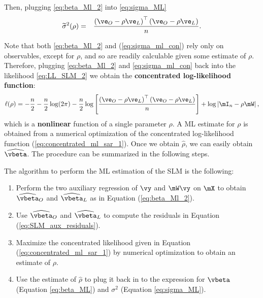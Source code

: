 Then, plugging \eqref{eq:beta_Ml_2} into \eqref{eq:sigma_ML}
\begin{eqnarray}\label{eq:sigma_ml_con}
\widetilde{\sigma}^2(\rho) &=& \frac{\left(\ve_O - \rho\ve_L\right)^\top\left(\ve_O - \rho\ve_L\right)}{n}.
\end{eqnarray}

Note that both \eqref{eq:beta_Ml_2} and (\ref{eq:sigma_ml_con}) rely only on observables, except for $\rho$, and so are readily calculable given some estimate of $\rho$. Therefore, plugging \eqref{eq:beta_Ml_2} and \eqref{eq:sigma_ml_con} back into the likelihood \eqref{eq:LL_SLM_2}  we obtain the \textbf{concentrated log-likelihood function}:
\begin{equation}\label{eq:concentrated_ml_sar_1}
\ell(\rho)=-\frac{n}{2}-\frac{n}{2}\log(2\pi) - \frac{n}{2}\log\left[\frac{\left(\ve_O - \rho\ve_L\right)^\top\left(\ve_O - \rho\ve_L\right)}{n}\right] + \log\left|\mI_n - \rho\mW\right|,
\end{equation}	
%	
which is a \textbf{nonlinear} function of a single parameter $\rho$. A ML estimate for $\rho$ is obtained from a numerical optimization of the concentrated log-likelihood function (\ref{eq:concentrated_ml_sar_1}). Once we obtain $\widehat{\rho}$, we can easily obtain $\widehat{\vbeta}$.  The procedure can be summarized in the following steps.

\begin{algorithm}\label{algorithm:SLM}
The algorithm to perform the ML estimation of the SLM is the following: 
\begin{enumerate}
	\item Perform the two auxiliary regression of $\vy$ and $\mW\vy$ on $\mX$ to obtain $\widehat{\vbeta}_O$ and $\widehat{\vbeta}_L$ as in Equation (\ref{eq:beta_Ml_2}).
	\item Use $\widehat{\vbeta}_O$ and $\widehat{\vbeta}_L$ to compute the residuals in Equation (\ref{eq:SLM_aux_residuals}). 
	\item Maximize the concentrated likelihood given in Equation (\ref{eq:concentrated_ml_sar_1}) by numerical optimization to obtain an estimate of $\rho$.
	\item Use the estimate of $\widehat{\rho}$ to plug it back in to the expression for $\vbeta$ (Equation \ref{eq:beta_ML}) and $\sigma^2$	 (Equation \ref{eq:sigma_ML}).
\end{enumerate}	
\end{algorithm}

